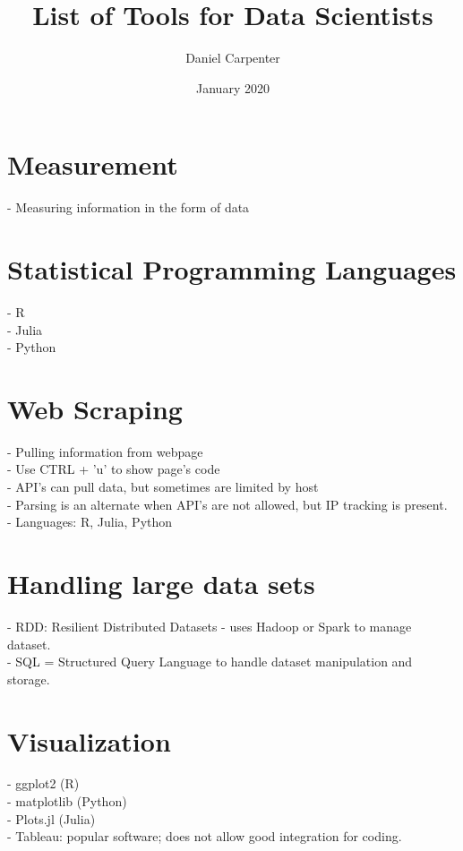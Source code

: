 \documentclass{article}
\title{List of Tools for Data Scientists}
\author{Daniel Carpenter}
\date{January 2020}
\begin{document}
\maketitle

\section{Measurement}
   - Measuring information in the form of data
\\
\section{Statistical Programming Languages}
   - R
\\
   - Julia
\\
   - Python
\\
\section{Web Scraping}
   - Pulling information from webpage
\\
   - Use CTRL + 'u' to show page's code
\\
   - API's can pull data, but sometimes are limited by host
\\
   - Parsing is an alternate when API's are not allowed, but IP tracking is present.
\\
   - Languages: R, Julia, Python

\section{Handling large data sets}
   - RDD: Resilient Distributed Datasets - uses Hadoop or Spark to manage dataset.
\\
   - SQL = Structured Query Language to handle dataset manipulation and storage.

\section{Visualization}
   - ggplot2 (R)
\\
   - matplotlib (Python)
\\
   - Plots.jl (Julia)
\\
   - Tableau: popular software; does not allow good integration for coding.
\pagebreak
\end{document}
